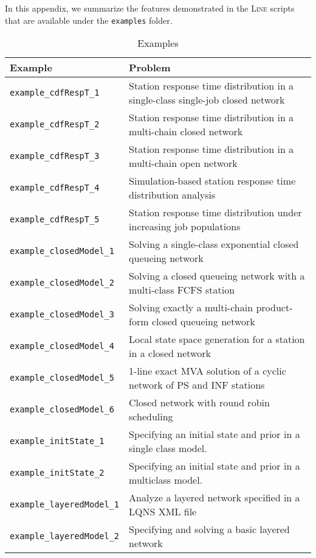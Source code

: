 In this appendix, we summarize the features demonstrated in the \textsc{Line} scripts that are available under the \texttt{examples} folder.

{
\begin{table}[thbp]
\footnotesize
\renewcommand{\arraystretch}{1.2}
\centering
\caption{Examples}
\begin{tabular}{|l|l|}
\hline
\textbf{Example} & \textbf{Problem}\\
\hline
\texttt{example\_cdfRespT\_1} &  Station response time distribution in a single-class single-job closed network\\
\texttt{example\_cdfRespT\_2} &  Station response time distribution in a multi-chain closed network\\
\texttt{example\_cdfRespT\_3} &  Station response time distribution in a multi-chain open network\\
\texttt{example\_cdfRespT\_4} &  Simulation-based station response time distribution analysis\\
\texttt{example\_cdfRespT\_5} &  Station response time distribution under increasing job populations\\
\hline
\texttt{example\_closedModel\_1} &  Solving a single-class exponential closed queueing network\\
\texttt{example\_closedModel\_2} &  Solving a closed queueing network with a multi-class FCFS station\\
\texttt{example\_closedModel\_3} &  Solving exactly a multi-chain product-form closed queueing network\\
\texttt{example\_closedModel\_4} &  Local state space generation for a station in a closed network\\
\texttt{example\_closedModel\_5} &  1-line exact MVA solution of a cyclic network of PS and INF stations\\
\texttt{example\_closedModel\_6} &  Closed network with round robin scheduling\\
\hline
\texttt{example\_initState\_1} &  Specifying an initial state and prior in a single class model.\\
\texttt{example\_initState\_2} &  Specifying an initial state and prior in a multiclass model.\\
\hline
\texttt{example\_layeredModel\_1} & Analyze a layered network specified in a LQNS XML file \\
\texttt{example\_layeredModel\_2} & Specifying and solving a basic layered network\\

\end{tabular}
\end{table}}
